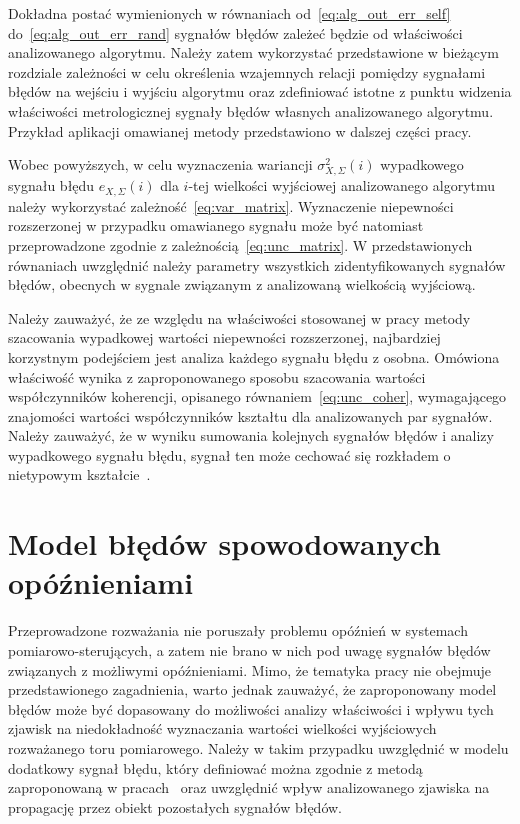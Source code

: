 Dokładna postać wymienionych w równaniach od~\eqref{eq:alg_out_err_self} do~\eqref{eq:alg_out_err_rand} sygnałów błędów zależeć będzie od właściwości analizowanego algorytmu. Należy zatem wykorzystać przedstawione w bieżącym rozdziale zależności w celu określenia wzajemnych relacji pomiędzy sygnałami błędów na wejściu i wyjściu algorytmu oraz zdefiniować istotne z punktu widzenia właściwości metrologicznej sygnały błędów własnych analizowanego algorytmu. Przykład aplikacji omawianej metody przedstawiono w dalszej części pracy.

Wobec powyższych, w celu wyznaczenia wariancji $\sigma_{X,\Sigma}^{2}(i)$ wypadkowego sygnału błędu $e_{X,\Sigma}(i)$ dla $i$-tej wielkości wyjściowej analizowanego algorytmu należy wykorzystać zależność~\eqref{eq:var_matrix}. Wyznaczenie niepewności rozszerzonej w przypadku omawianego sygnału może być natomiast przeprowadzone zgodnie z zależnością~\eqref{eq:unc_matrix}. W przedstawionych równaniach uwzględnić należy parametry wszystkich zidentyfikowanych sygnałów błędów, obecnych w sygnale związanym z analizowaną wielkością wyjściową.

Należy zauważyć, że ze względu na właściwości stosowanej w pracy metody szacowania wypadkowej wartości niepewności rozszerzonej, najbardziej korzystnym podejściem jest analiza każdego sygnału błędu z osobna. Omówiona właściwość wynika z zaproponowanego sposobu szacowania wartości współczynników koherencji, opisanego równaniem~\eqref{eq:unc_coher}, wymagającego znajomości wartości współczynników kształtu dla analizowanych par sygnałów. Należy zauważyć, że w wyniku sumowania kolejnych sygnałów błędów i analizy wypadkowego sygnału błędu, sygnał ten może cechować się rozkładem o nietypowym kształcie~\cite{auth_electronics, zhang_pdp}.

\section{Model błędów spowodowanych opóźnieniami}

Przeprowadzone rozważania nie poruszały problemu opóźnień w systemach pomiarowo-sterujących, a zatem nie brano w nich pod uwagę sygnałów błędów związanych z możliwymi opóźnieniami. Mimo, że tematyka pracy nie obejmuje przedstawionego zagadnienia, warto jednak zauważyć, że zaproponowany model błędów może być dopasowany do możliwości analizy właściwości i wpływu tych zjawisk na niedokładność wyznaczania wartości wielkości wyjściowych rozważanego toru pomiarowego. Należy w takim przypadku uwzględnić w modelu dodatkowy sygnał błędu, który definiować można zgodnie z metodą zaproponowaną w pracach~\cite{wymyslo_delay, jakubiec_system} oraz uwzględnić wpływ analizowanego zjawiska na propagację przez obiekt pozostałych sygnałów błędów.

